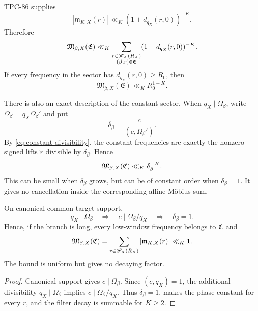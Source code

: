 TPC-86 supplies
\[
 |\mathfrak m_{K,X}(r)|
 \ll_K(1+d_{q_X}(r,0))^{-K}.
\]
Therefore
\begin{equation}
 \mathfrak M_{\beta,X}(\mathfrak E)
 \ll_K
 \sum_{\substack{r\in\mathscr W_X(R_X)\\
                 (\beta,r)\in\mathfrak E}}
 (1+d_{q_X}(r,0))^{-K}.
\label{eq:multiplier-decay-mass}
\end{equation}
If every frequency in the sector has
\(d_{q_X}(r,0)\ge R_0\), then
\begin{equation}
 \mathfrak M_{\beta,X}(\mathfrak E)
 \ll_K R_0^{1-K}.
\label{eq:far-frequency-mass}
\end{equation}

There is also an exact description of the constant sector.  When
\(q_X\mid\Omega_\beta\), write
\(\Omega_\beta=q_X\Omega_\beta'\) and put
\[
 \delta_\beta
 =
 \frac{c}{(c,\Omega_\beta')}.
\]
By \eqref{eq:constant-divisibility}, the constant frequencies are
exactly the nonzero signed lifts \(\widetilde r\) divisible by
\(\delta_\beta\).  Hence
\begin{equation}
 \mathfrak M_{\beta,X}(\mathfrak C)
 \ll_K \delta_\beta^{-K}.
\label{eq:constant-multiplier-mass}
\end{equation}
This can be small when \(\delta_\beta\) grows, but can be of constant
order when \(\delta_\beta=1\).  It gives no cancellation inside the
corresponding affine M\"obius sum.

\begin{corollary}
\label{cor:no-literal-constant-discount}
On canonical common-target support,
\[
 q_X\mid\Omega_\beta
 \quad\Longrightarrow\quad
 c\mid\Omega_\beta/q_X
 \quad\Longrightarrow\quad
 \delta_\beta=1.
\]
Hence, if the branch is long, every low-window frequency belongs to
\(\mathfrak C\) and
\begin{equation}
 \mathfrak M_{\beta,X}(\mathfrak C)
 =
 \sum_{r\in\mathscr W_X(R_X)}
 |\mathfrak m_{K,X}(r)|
 \ll_K1.
\label{eq:literal-constant-full-mass}
\end{equation}
The bound is uniform but gives no decaying factor.
\end{corollary}

\begin{proof}
Canonical support gives \(c\mid\Omega_\beta\).  Since
\((c,q_X)=1\), the additional divisibility
\(q_X\mid\Omega_\beta\) implies
\(c\mid\Omega_\beta/q_X\).  Thus \(\delta_\beta=1\).
 makes the phase constant for
every \(r\), and the filter decay is summable for \(K\ge2\).
\end{proof}

